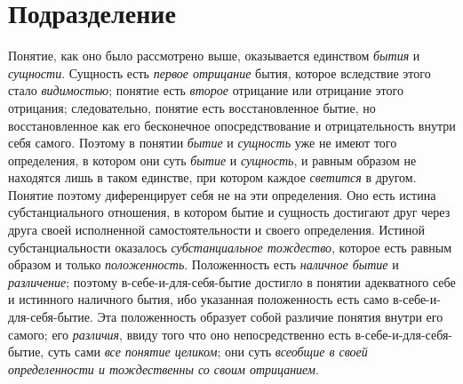 {\section[Подразделение]{Подразделение}
Понятие, как оно было рассмотрено выше, оказывается единством
{\em бытия} и
{\em сущности}. Сущность
есть {\em первое отрицание}
бытия, которое вследствие этого стало
{\em видимостью}; понятие
есть {\em второе}
отрицание или отрицание этого отрицания; следовательно,
понятие есть восстановленное бытие, но восстановленное как его бесконечное
опосредствование и отрицательность внутри себя самого. Поэтому в понятии
{\em бытие} и
{\em сущность} уже не
имеют того определения, в котором они суть
{\em бытие} и
{\em сущность}, и равным
образом не находятся лишь в таком единстве, при котором каждое
{\em светится} в другом.
Понятие поэтому диференцирует себя не на эти определения. Оно есть истина
субстанциального отношения, в котором бытие и сущность достигают друг через
друга своей исполненной самостоятельности и своего определения. Истиной
субстанциальности оказалось
{\em субстанциальное тождество},
которое есть равным образом и только
{\em положенность}.
Положенность есть
{\em наличное бытие} и
{\em различение}; поэтому
в-себе-и-для-себя-бытие достигло в понятии адекватного себе и истинного
наличного бытия, ибо указанная положенность есть само
в-себе-и-для-себя-бытие. Эта положенность образует собой различие понятия
внутри его самого; его {\em различия}, ввиду того что
оно
непосредственно есть в-себе-и-для-себя-бытие, суть сами
{\em все понятие целиком};
они суть {\em всеобщие в
своей определенности и тождественны со своим отрицанием}.

}

